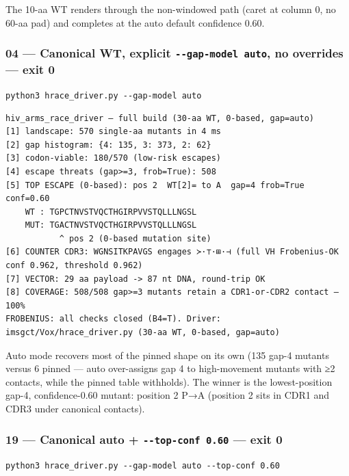 \documentclass[12pt,a4paper]{article}
\begin{document}
The 10-aa WT renders through the non-windowed path (caret at column 0,
no 60-aa pad) and completes at the auto default confidence 0.60.

\hypertarget{canonical-wt-explicit---gap-model-auto-no-overrides-exit-0}{%
\subsubsection{\texorpdfstring{04 --- Canonical WT, explicit
\texttt{-\/-gap-model\ auto}, no overrides --- exit
0}{04 --- Canonical WT, explicit -\/-gap-model auto, no overrides --- exit 0}}\label{canonical-wt-explicit---gap-model-auto-no-overrides-exit-0}}

\texttt{python3\ hrace\_driver.py\ -\/-gap-model\ auto}

\begin{verbatim}
hiv_arms_race_driver — full build (30-aa WT, 0-based, gap=auto)
[1] landscape: 570 single-aa mutants in 4 ms
[2] gap histogram: {4: 135, 3: 373, 2: 62}
[3] codon-viable: 180/570 (low-risk escapes)
[4] escape threats (gap>=3, frob=True): 508
[5] TOP ESCAPE (0-based): pos 2  WT[2]= to A  gap=4 frob=True conf=0.60
    WT : TGPCTNVSTVQCTHGIRPVVSTQLLLNGSL
    MUT: TGACTNVSTVQCTHGIRPVVSTQLLLNGSL
           ^ pos 2 (0-based mutation site)
[6] COUNTER CDR3: WGNSITKPAVGS engages ≻·⊤·⊞·⊣ (full VH Frobenius-OK conf 0.962, threshold 0.962)
[7] VECTOR: 29 aa payload -> 87 nt DNA, round-trip OK
[8] COVERAGE: 508/508 gap>=3 mutants retain a CDR1-or-CDR2 contact — 100%
FROBENIUS: all checks closed (B4=T). Driver: imsgct/Vox/hrace_driver.py (30-aa WT, 0-based, gap=auto)
\end{verbatim}

Auto mode recovers most of the pinned shape on its own (135 gap-4
mutants versus 6 pinned --- auto over-assigns gap 4 to high-movement
mutants with ≥2 contacts, while the pinned table withholds). The winner
is the lowest-position gap-4, confidence-0.60 mutant: position 2 P→A
(position 2 sits in CDR1 and CDR3 under canonical contacts).

\hypertarget{canonical-auto---top-conf-0.60-exit-0}{%
\subsubsection{\texorpdfstring{19 --- Canonical auto +
\texttt{-\/-top-conf\ 0.60} --- exit
0}{19 --- Canonical auto + -\/-top-conf 0.60 --- exit 0}}\label{canonical-auto---top-conf-0.60-exit-0}}

\texttt{python3\ hrace\_driver.py\ -\/-gap-model\ auto\ -\/-top-conf\ 0.60}
\end{document}
